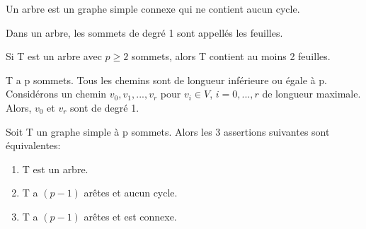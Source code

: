 \begin{defn}
Un arbre est un graphe simple connexe qui ne contient aucun cycle.\\
\end{defn}

\begin{defn}
Dans un arbre, les sommets de degré 1 sont appellés les feuilles.\\
\end{defn}

\begin{exmp}

\end{exmp}



\begin{prop}
Si T est un arbre avec $p\geq2$ sommets, alors T contient au moins 2 feuilles.
\end{prop}

\begin{demo}
T a p sommets. Tous les chemins sont de longueur inférieure ou égale à p. Considérons un chemin $v_{0},v_{1},...,v_{r}$ pour $v_{i} \in V$, $i=0,...,r$ de longueur maximale. Alors, $v_{0}$ et $v_{r}$ sont de degré 1.\\
\end{demo}

\begin{thrm}
Soit T un graphe simple à p sommets. Alors les 3 assertions suivantes sont équivalentes:
	\begin{enumerate}[i]
		\item T est un arbre.
		\item T a $(p-1)$ arêtes et aucun cycle.
		\item T a $(p-1)$ arêtes et est connexe.
	\end{enumerate}
\end{thrm}

